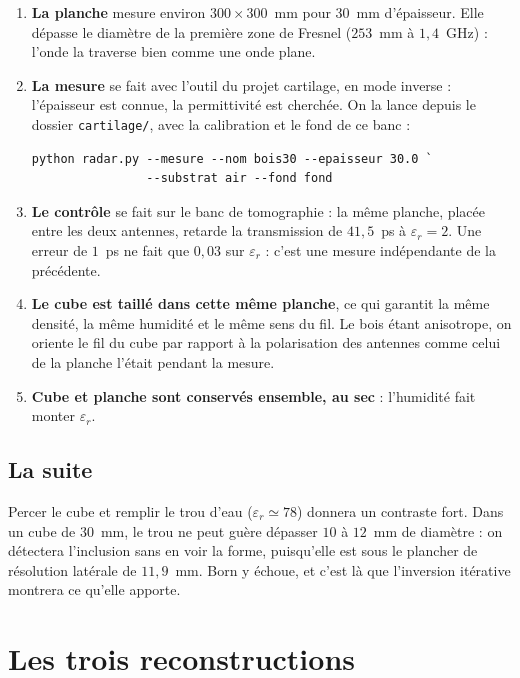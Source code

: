 \documentclass[11pt,a4paper]{article}
\newcommand{\eps}{\varepsilon_r}
\begin{document}
\begin{enumerate}
\item \textbf{La planche} mesure environ $300 \times 300$~mm pour $30$~mm
      d'épaisseur. Elle dépasse le diamètre de la première zone de Fresnel
      ($253$~mm à $1{,}4$~GHz) : l'onde la traverse bien comme une onde plane.
\item \textbf{La mesure} se fait avec l'outil du projet cartilage, en mode
      inverse : l'épaisseur est connue, la permittivité est cherchée. On la lance
      depuis le dossier \texttt{cartilage/}, avec la calibration et le fond de ce
      banc :
\begin{verbatim}
python radar.py --mesure --nom bois30 --epaisseur 30.0 `
                --substrat air --fond fond
\end{verbatim}
\item \textbf{Le contrôle} se fait sur le banc de tomographie : la même planche,
      placée entre les deux antennes, retarde la transmission de $41{,}5$~ps à
      $\eps = 2$. Une erreur de $1$~ps ne fait que $0{,}03$ sur $\eps$ : c'est une
      mesure indépendante de la précédente.
\item \textbf{Le cube est taillé dans cette même planche}, ce qui garantit la même
      densité, la même humidité et le même sens du fil. Le bois étant anisotrope,
      on oriente le fil du cube par rapport à la polarisation des antennes comme
      celui de la planche l'était pendant la mesure.
\item \textbf{Cube et planche sont conservés ensemble, au sec} : l'humidité fait
      monter $\eps$.
\end{enumerate}

\subsection{La suite}

Percer le cube et remplir le trou d'eau ($\eps \simeq 78$) donnera un contraste
fort. Dans un cube de $30$~mm, le trou ne peut guère dépasser $10$ à $12$~mm de
diamètre : on détectera l'inclusion sans en voir la forme, puisqu'elle est sous
le plancher de résolution latérale de $11{,}9$~mm. Born y échoue, et c'est là que
l'inversion itérative montrera ce qu'elle apporte.

\section{Les trois reconstructions}
\label{sec:reconstructions}
\end{document}
